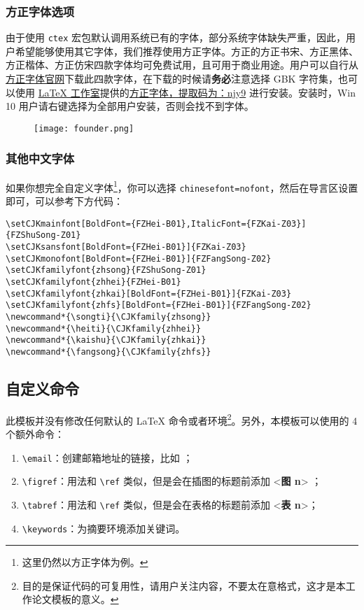 \documentclass[lang=cn,a4paper,newtx]{elegantpaper}
\begin{document}
\subsubsection{方正字体选项}
由于使用 \lstinline{ctex} 宏包默认调用系统已有的字体，部分系统字体缺失严重，因此，用户希望能够使用其它字体，我们推荐使用方正字体。方正的{\songti 方正书宋}、{\heiti 方正黑体}、{\kaishu 方正楷体}、{\fangsong 方正仿宋}四款字体均可免费试用，且可用于商业用途。用户可以自行从\href{http://www.foundertype.com/}{方正字体官网}下载此四款字体，在下载的时候请\textbf{务必}注意选择 GBK 字符集，也可以使用 \href{https://www.latexstudio.net/}{\LaTeX{} 工作室}提供的\href{https://pan.baidu.com/s/1BgbQM7LoinY7m8yeP25Y7Q}{方正字体，提取码为：njy9} 进行安装。安装时，{\kaishu Win 10 用户请右键选择为全部用户安装，否则会找不到字体。}

\begin{figure}[!htb]
\centering
\texttt{[image: founder.png]}
\end{figure}

\subsubsection{其他中文字体}
如果你想完全自定义字体\footnote{这里仍然以方正字体为例。}，你可以选择 \lstinline{chinesefont=nofont}，然后在导言区设置即可，可以参考下方代码：
\begin{lstlisting}
\setCJKmainfont[BoldFont={FZHei-B01},ItalicFont={FZKai-Z03}]{FZShuSong-Z01}
\setCJKsansfont[BoldFont={FZHei-B01}]{FZKai-Z03}
\setCJKmonofont[BoldFont={FZHei-B01}]{FZFangSong-Z02}
\setCJKfamilyfont{zhsong}{FZShuSong-Z01}
\setCJKfamilyfont{zhhei}{FZHei-B01}
\setCJKfamilyfont{zhkai}[BoldFont={FZHei-B01}]{FZKai-Z03}
\setCJKfamilyfont{zhfs}[BoldFont={FZHei-B01}]{FZFangSong-Z02}
\newcommand*{\songti}{\CJKfamily{zhsong}}
\newcommand*{\heiti}{\CJKfamily{zhhei}}
\newcommand*{\kaishu}{\CJKfamily{zhkai}}
\newcommand*{\fangsong}{\CJKfamily{zhfs}}
\end{lstlisting}



\subsection{自定义命令}
此模板并没有修改任何默认的 \LaTeX{} 命令或者环境\footnote{目的是保证代码的可复用性，请用户关注内容，不要太在意格式，这才是本工作论文模板的意义。}。另外，本模板可以使用的 4 个额外命令：
\begin{enumerate}
  \item \lstinline{\email}：创建邮箱地址的链接，比如 ；
  \item \lstinline{\figref}：用法和 \lstinline{\ref} 类似，但是会在插图的标题前添加 <\textbf{图 n}> ；
  \item \lstinline{\tabref}：用法和 \lstinline{\ref} 类似，但是会在表格的标题前添加 <\textbf{表 n}>；
  \item \lstinline{\keywords}：为摘要环境添加关键词。
\end{enumerate}
\end{document}
